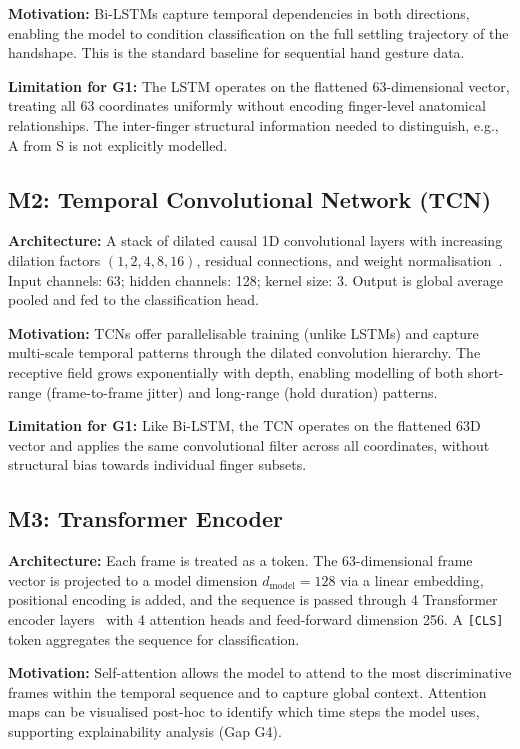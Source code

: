 \documentclass[conference]{IEEEtran}
\begin{document}
\textbf{Motivation:} Bi-LSTMs capture temporal dependencies in both directions,
enabling the model to condition classification on the full settling trajectory
of the handshape. This is the standard baseline for sequential hand gesture data.

\textbf{Limitation for G1:} The LSTM operates on the flattened 63-dimensional
vector, treating all 63 coordinates uniformly without encoding finger-level
anatomical relationships. The inter-finger structural information needed to
distinguish, e.g., A from S is not explicitly modelled.

\subsection{M2: Temporal Convolutional Network (TCN)}

\textbf{Architecture:} A stack of dilated causal 1D convolutional layers with
increasing dilation factors $(1, 2, 4, 8, 16)$, residual connections, and weight
normalisation~\cite{bai2018tcn}. Input channels: 63; hidden channels: 128; kernel
size: 3. Output is global average pooled and fed to the classification head.

\textbf{Motivation:} TCNs offer parallelisable training (unlike LSTMs) and
capture multi-scale temporal patterns through the dilated convolution hierarchy.
The receptive field grows exponentially with depth, enabling modelling of both
short-range (frame-to-frame jitter) and long-range (hold duration) patterns.

\textbf{Limitation for G1:} Like Bi-LSTM, the TCN operates on the flattened
63D vector and applies the same convolutional filter across all coordinates,
without structural bias towards individual finger subsets.

\subsection{M3: Transformer Encoder}

\textbf{Architecture:} Each frame is treated as a token. The 63-dimensional
frame vector is projected to a model dimension $d_\text{model} = 128$ via a
linear embedding, positional encoding is added, and the sequence is passed
through 4 Transformer encoder layers~\cite{vaswani2017} with 4 attention heads
and feed-forward dimension 256. A \texttt{[CLS]} token aggregates the sequence
for classification.

\textbf{Motivation:} Self-attention allows the model to attend to the most
discriminative frames within the temporal sequence and to capture global context.
Attention maps can be visualised post-hoc to identify which time steps the model
uses, supporting explainability analysis (Gap G4).
\end{document}
